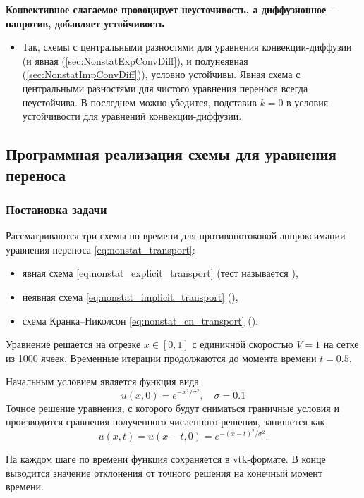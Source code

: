 {\bf Конвективное слагаемое провоцирует неусточивость, а диффузионное -- напротив, добавляет устойчивость}
\begin{itemize}
\item
Так, схемы с центральными разностями для уравнения конвекции-диффузии
(и явная (\ref{sec:NonstatExpConvDiff}), и полунеявная (\ref{sec:NonstatImpConvDiff})),
условно устойчивы. Явная схема с центральными разностями для чистого уравнения переноса всегда неустойчива.
В последнем можно убедится, подставив $k=0$ в условия устойчивости для уравнений конвекции-диффузии.
\end{itemize}

\subsection{Программная реализация схемы для уравнения переноса}

\subsubsection{Постановка задачи}
Рассматриваются три схемы по времени для противопотоковой аппроксимации уравнения переноса \eqref{eq:nonstat_transport}: 
\begin{itemize}
\item явная схема \eqref{eq:nonstat_explicit_transport} (тест называется ),
\item неявная схема \eqref{eq:nonstat_implicit_transport} (),
\item схема Кранка--Николсон \eqref{eq:nonstat_cn_transport} (\cvar{[tranport1-cn]}).
\end{itemize}

Уравнение решается на отрезке $x\in[0, 1]$ с единичной скоростью $V = 1$
на сетке из 1000 ячеек. Временные итерации продолжаются до момента времени $t = 0.5$.

Начальным условием является функция вида
\begin{equation*}
    u(x, 0) = e^{-x^2/\sigma^2}, \quad \sigma = 0.1
\end{equation*}
Точное решение уравнения, с которого будут сниматься граничные условия и производится сравнения полученного численного решения,
запишется как
\begin{equation*}
    u(x, t) = u(x - t, 0) = e^{-(x-t)^2/\sigma^2}.
\end{equation*}

На каждом шаге по времени функция сохраняется в vtk-формате.
В конце выводится значение отклонения от точного решения на конечный момент времени.

